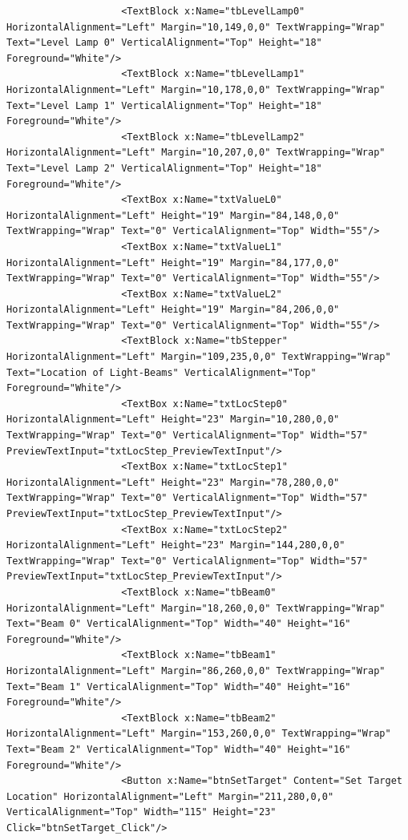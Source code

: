\begin{lstlisting}
                    <TextBlock x:Name="tbLevelLamp0" HorizontalAlignment="Left" Margin="10,149,0,0" TextWrapping="Wrap" Text="Level Lamp 0" VerticalAlignment="Top" Height="18" Foreground="White"/>
                    <TextBlock x:Name="tbLevelLamp1" HorizontalAlignment="Left" Margin="10,178,0,0" TextWrapping="Wrap" Text="Level Lamp 1" VerticalAlignment="Top" Height="18" Foreground="White"/>
                    <TextBlock x:Name="tbLevelLamp2" HorizontalAlignment="Left" Margin="10,207,0,0" TextWrapping="Wrap" Text="Level Lamp 2" VerticalAlignment="Top" Height="18" Foreground="White"/>
                    <TextBox x:Name="txtValueL0" HorizontalAlignment="Left" Height="19" Margin="84,148,0,0" TextWrapping="Wrap" Text="0" VerticalAlignment="Top" Width="55"/>
                    <TextBox x:Name="txtValueL1" HorizontalAlignment="Left" Height="19" Margin="84,177,0,0" TextWrapping="Wrap" Text="0" VerticalAlignment="Top" Width="55"/>
                    <TextBox x:Name="txtValueL2" HorizontalAlignment="Left" Height="19" Margin="84,206,0,0" TextWrapping="Wrap" Text="0" VerticalAlignment="Top" Width="55"/>
                    <TextBlock x:Name="tbStepper" HorizontalAlignment="Left" Margin="109,235,0,0" TextWrapping="Wrap" Text="Location of Light-Beams" VerticalAlignment="Top" Foreground="White"/>
                    <TextBox x:Name="txtLocStep0" HorizontalAlignment="Left" Height="23" Margin="10,280,0,0" TextWrapping="Wrap" Text="0" VerticalAlignment="Top" Width="57" PreviewTextInput="txtLocStep_PreviewTextInput"/>
                    <TextBox x:Name="txtLocStep1" HorizontalAlignment="Left" Height="23" Margin="78,280,0,0" TextWrapping="Wrap" Text="0" VerticalAlignment="Top" Width="57" PreviewTextInput="txtLocStep_PreviewTextInput"/>
                    <TextBox x:Name="txtLocStep2" HorizontalAlignment="Left" Height="23" Margin="144,280,0,0" TextWrapping="Wrap" Text="0" VerticalAlignment="Top" Width="57" PreviewTextInput="txtLocStep_PreviewTextInput"/>
                    <TextBlock x:Name="tbBeam0" HorizontalAlignment="Left" Margin="18,260,0,0" TextWrapping="Wrap" Text="Beam 0" VerticalAlignment="Top" Width="40" Height="16" Foreground="White"/>
                    <TextBlock x:Name="tbBeam1" HorizontalAlignment="Left" Margin="86,260,0,0" TextWrapping="Wrap" Text="Beam 1" VerticalAlignment="Top" Width="40" Height="16" Foreground="White"/>
                    <TextBlock x:Name="tbBeam2" HorizontalAlignment="Left" Margin="153,260,0,0" TextWrapping="Wrap" Text="Beam 2" VerticalAlignment="Top" Width="40" Height="16" Foreground="White"/>
                    <Button x:Name="btnSetTarget" Content="Set Target Location" HorizontalAlignment="Left" Margin="211,280,0,0" VerticalAlignment="Top" Width="115" Height="23" Click="btnSetTarget_Click"/>

\end{lstlisting}
